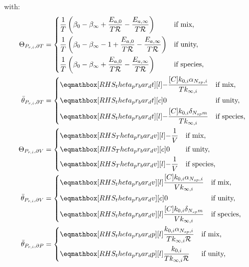 \documentclass[12pt,number,sort&compress]{elsarticle}
\begin{document}
with:
\begin{align}
 \label{e:dpr_theta_dt}
 \Theta_{P_{r,i}, \partial T} &=
 \begin{dcases}
  \frac{1}{T} \left(\beta_{0} - \beta_{\infty} + \frac{E_{a, 0}}{T \Ru/} - \frac{E_{a, \infty}}{T \Ru/}\right) & \text{if mix,} \\
  \frac{1}{T} \left(\beta_{0} - \beta_{\infty} - 1 + \frac{E_{a, 0}}{T \Ru/} - \frac{E_{a, \infty}}{T \Ru/}\right) & \text{if unity,} \\
  \frac{1}{T} \left(\beta_{0} - \beta_{\infty} + \frac{E_{a, 0}}{T \Ru/} - \frac{E_{a, \infty}}{T \Ru/}\right) & \text{if species,}
 \end{dcases} \\
 \label{e:dpr_theta_bar_dt}
 \bar{\theta}_{P_{r, i}, \partial T} &=
 \begin{dcases}
  \rhs{theta_pr_bar_dt}{- \frac{[C] k_{0, i} \alpha_{\ns/,i}}{T k_{\infty, i}}} & \text{if mix,} \\
  \rhs{theta_pr_bar_dt}{0}[c] & \text{if unity,} \\
  \rhs{theta_pr_bar_dt}{- \frac{[C] k_{0, i} \delta_{\ns/ m}}{T k_{\infty, i}}} & \text{if species,}
 \end{dcases} \\
 \label{e:dpr_theta_dv}
 \Theta_{P_{r,i}, \partial V} &=
 \begin{dcases}
  \rhs{Theta_pr_bar_dv}{- \frac{1}{V}} & \text{if mix,} \\
  \rhs{Theta_pr_bar_dv}{0}[c] & \text{if unity,}  \\
  \rhs{Theta_pr_bar_dv}{- \frac{1}{V}} & \text{if species,}
 \end{dcases} \\
 \label{e:dpr_theta_bar_dv}
 \bar{\theta}_{P_{r, i}, \partial V} &=
 \begin{dcases}
  \rhs{theta_pr_bar_dv}{\frac{[C] k_{0, i} \alpha_{\ns/,i}}{V k_{\infty, i}}} & \text{if mix,} \\
  \rhs{theta_pr_bar_dv}{0}[c] & \text{if unity,}  \\
  \rhs{theta_pr_bar_dv}{\frac{[C] k_{0, i} \delta_{\ns/ m}}{V k_{\infty, i}}} & \text{if species,}
 \end{dcases} \\
 \label{e:dpr_theta_dp}
 \bar{\theta}_{P_{r, i}, \partial P} &=
 \begin{dcases}
  \rhs{theta_pr_bar_dp}{\frac{k_{0, i} \alpha_{\ns/,i}}{T k_{\infty, i} \Ru/}} & \text{if mix,} \\
  \rhs{theta_pr_bar_dp}{\frac{k_{0, i}}{T k_{\infty, i} \Ru/}} & \text{if unity,}  \\

\end{dcases}
\end{align}
\end{document}
